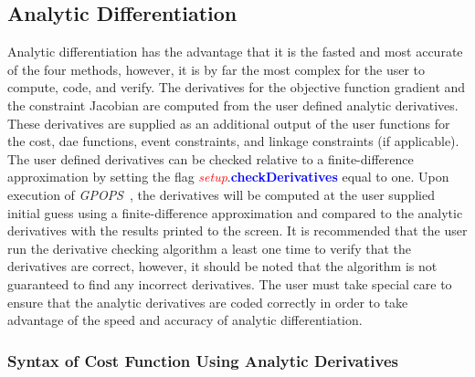 \documentclass[10pt]{article}
\newcommand{\gpops}{{\em GPOPS}~}
\newcommand{\bfblue}[1]{\textcolor{blue}{\bf #1}}
\newcommand{\slred}[1]{\textcolor{red}{\sl #1}}
\begin{document}
\subsection{Analytic Differentiation}

Analytic differentiation has the advantage that it is the fasted and
most accurate of the four methods, however, it is by far the most
complex for the user to compute, code, and verify.  The derivatives
for the objective function gradient and the constraint Jacobian are
computed from the user defined analytic derivatives.  These
derivatives are supplied as an additional output of the user functions
for the cost, dae functions, event constraints, and linkage
constraints (if applicable).  The user defined derivatives can be
checked relative to a finite-difference approximation by setting the
flag \slred{setup}.\bfblue{checkDerivatives} equal to one. Upon
execution of \gpops, the derivatives will be computed at the user
supplied initial guess using a finite-difference approximation and
compared to the analytic derivatives with the results printed to the
screen.  It is recommended that the user run the derivative checking
algorithm a least one time to verify that the derivatives are correct,
however, it should be noted that the algorithm is not guaranteed to
find any incorrect derivatives.  The user must take special care to
ensure that the analytic derivatives are coded correctly in order to
take advantage of the speed and accuracy of analytic differentiation. 

\subsubsection{Syntax of Cost Function Using Analytic Derivatives}
\end{document}
